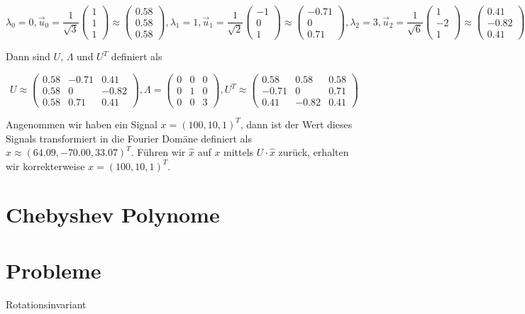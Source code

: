 \begin{equation}
  \lambda_0 = 0, \vec{u}_0 = \frac{1}{\sqrt{3}} \begin{pmatrix}1\\1\\1\end{pmatrix} \approx \begin{pmatrix}0.58\\0.58\\0.58\end{pmatrix},
    \lambda_1 = 1, \vec{u}_1 = \frac{1}{\sqrt{2}} \begin{pmatrix}-1\\0\\1\end{pmatrix} \approx \begin{pmatrix}-0.71\\0\\0.71\end{pmatrix},
      \lambda_2 = 3, \vec{u}_2 = \frac{1}{\sqrt{6}} \begin{pmatrix}1\\-2\\1\end{pmatrix} \approx \begin{pmatrix}0.41\\-0.82\\0.41\end{pmatrix}
\end{equation}

Dann sind $U$, $\Lambda$ und $U^T$ definiert als

\begin{equation}
  U \approx \begin{pmatrix}
    0.58 & -0.71 & 0.41\\
    0.58 & 0 & -0.82\\
    0.58 & 0.71 & 0.41
  \end{pmatrix},
  \Lambda = \begin{pmatrix}
    0 & 0 & 0\\
    0 & 1 & 0\\
    0 & 0 & 3
  \end{pmatrix},
  U^T \approx \begin{pmatrix}
    0.58 & 0.58 & 0.58\\
    -0.71 & 0 & 0.71\\
    0.41 & -0.82 & 0.41
  \end{pmatrix}
\end{equation}

Angenommen wir haben ein Signal $x = {(100, 10, 1)}^T$, dann ist der Wert dieses Signals transformiert in die Fourier Domäne definiert als $\hat x \approx {(64.09, -70.00, 33.07)}^T$.
Führen wir $\hat x$ auf $x$ mittels $U \cdot \hat x$ zurück, erhalten wir korrekterweise $x = {(100, 10, 1)}^T$.

\section{Chebyshev Polynome}

\section{Probleme}

Rotationsinvariant
